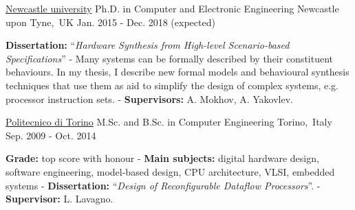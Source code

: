 
\begin{cventries}


\cventry
{\href{https://www.ncl.ac.uk/}{\color{myblue}Newcastle university}} %
{Ph.D. in Computer and Electronic Engineering} %
{Newcastle upon Tyne,~UK} %
{Jan. 2015 - Dec. 2018 (expected)} %
{ %
\begin{cvitems}
\textbf{Dissertation:} ``\textit{Hardware Synthesis from High-level 
Scenario-based Specifications}'' - Many systems can be formally described 
by their constituent behaviours. In my thesis, I describe new 
formal models and behavioural synthesis techniques that use them as aid to 
simplify the design of 
complex systems, e.g. processor instruction sets. - 
\textbf{Supervisors:} A. Mokhov, A. Yakovlev.
\end{cvitems}
}


\cventry
{\href{https://www.polito.it/?lang=en}{\color{myblue}Politecnico di Torino}}
{M.Sc. and B.Sc. in Computer Engineering}
{Torino,~Italy}
{Sep. 2009 - Oct. 2014}
{
\begin{cvitems}
\textbf{Grade:} top score with honour - \textbf{Main subjects:} 
digital hardware design, software engineering, model-based design, CPU 
architecture, VLSI, embedded systems - \textbf{Dissertation:} ``\emph{Design of 
Reconfigurable Dataflow Processors}''. - \textbf{Supervisor:} L. Lavagno.
\end{cvitems}
}


\end{cventries}
\vspace{-1mm}